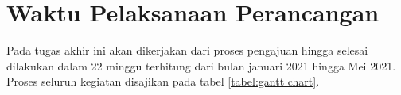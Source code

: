 \section{Waktu Pelaksanaan Perancangan}
Pada tugas akhir ini akan dikerjakan dari proses pengajuan hingga selesai dilakukan dalam 22 minggu terhitung dari bulan januari 2021 hingga Mei 2021. Proses seluruh kegiatan disajikan pada tabel \ref{tabel:gantt chart}.
\begin{table}[h]
	\centering
	\caption{Waktu Pelaksanaan Tugas Akhir}
	\label{tabel:gantt chart}
\end{table}
